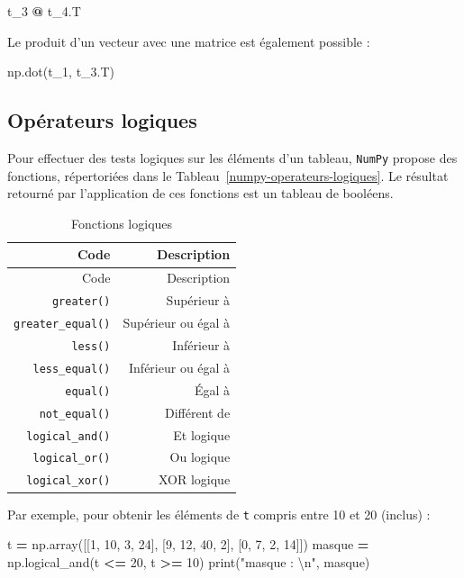 \documentclass[12pt,]{book}
\newenvironment{Shaded}{\begin{snugshade}}{\end{snugshade}}
\newcommand{\DecValTok}[1]{\textcolor[rgb]{0.00,0.00,0.81}{#1}}
\newcommand{\CharTok}[1]{\textcolor[rgb]{0.31,0.60,0.02}{#1}}
\newcommand{\StringTok}[1]{\textcolor[rgb]{0.31,0.60,0.02}{#1}}
\newcommand{\OperatorTok}[1]{\textcolor[rgb]{0.81,0.36,0.00}{\textbf{#1}}}
\newcommand{\BuiltInTok}[1]{#1}
\newcommand{\NormalTok}[1]{#1}
\numberwithin{equation}{section}
\numberwithin{countremarque}{section}
\begin{document}
\begin{Shaded}
\begin{Highlighting}[]
\NormalTok{t_3 }\OperatorTok{@}\NormalTok{ t_4.T}
\end{Highlighting}
\end{Shaded}

Le produit d'un vecteur avec une matrice est également possible :

\begin{Shaded}
\begin{Highlighting}[]
\NormalTok{np.dot(t_1, t_3.T)}
\end{Highlighting}
\end{Shaded}

\subsection{Opérateurs logiques}\label{operateurs-logiques}

Pour effectuer des tests logiques sur les éléments d'un tableau,
\texttt{NumPy} propose des fonctions, répertoriées dans le
Tableau~\ref{numpy-operateurs-logiques}. Le résultat retourné par
l'application de ces fonctions est un tableau de booléens.

\begin{longtable}[]{@{}rr@{}}
\caption{\label{tab:numpy-operateurs-logiques} Fonctions
logiques}\tabularnewline
\toprule
Code & Description\tabularnewline
\midrule
\endfirsthead
\toprule
Code & Description\tabularnewline
\midrule
\endhead
\texttt{greater()} & Supérieur à\tabularnewline
\texttt{greater\_equal()} & Supérieur ou égal à\tabularnewline
\texttt{less()} & Inférieur à\tabularnewline
\texttt{less\_equal()} & Inférieur ou égal à\tabularnewline
\texttt{equal()} & Égal à\tabularnewline
\texttt{not\_equal()} & Différent de\tabularnewline
\texttt{logical\_and()} & Et logique\tabularnewline
\texttt{logical\_or()} & Ou logique\tabularnewline
\texttt{logical\_xor()} & XOR logique\tabularnewline
\bottomrule
\end{longtable}

Par exemple, pour obtenir les éléments de \texttt{t} compris entre 10 et
20 (inclus) :

\begin{Shaded}
\begin{Highlighting}[]
\NormalTok{t }\OperatorTok{=}\NormalTok{ np.array([[}\DecValTok{1}\NormalTok{, }\DecValTok{10}\NormalTok{, }\DecValTok{3}\NormalTok{, }\DecValTok{24}\NormalTok{], [}\DecValTok{9}\NormalTok{, }\DecValTok{12}\NormalTok{, }\DecValTok{40}\NormalTok{, }\DecValTok{2}\NormalTok{], [}\DecValTok{0}\NormalTok{, }\DecValTok{7}\NormalTok{, }\DecValTok{2}\NormalTok{, }\DecValTok{14}\NormalTok{]])}
\NormalTok{masque }\OperatorTok{=}\NormalTok{ np.logical_and(t }\OperatorTok{<=} \DecValTok{20}\NormalTok{, t }\OperatorTok{>=} \DecValTok{10}\NormalTok{)}
\BuiltInTok{print}\NormalTok{(}\StringTok{"masque : }\CharTok{\textbackslash{}n}\StringTok{"}\NormalTok{, masque)}
\end{Highlighting}
\end{Shaded}
\end{document}

